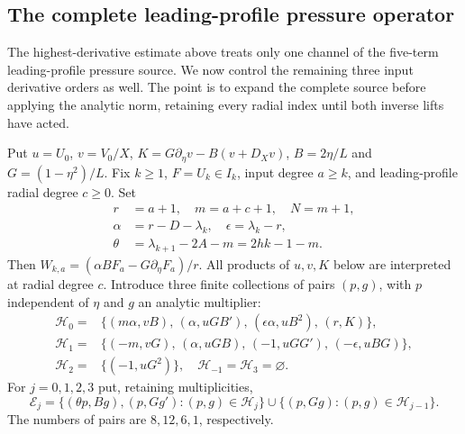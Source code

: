 \subsection{The complete leading-profile pressure operator}
\label{subsec:full-leading-normalform}
The highest-derivative estimate above treats only one channel of the five-term leading-profile pressure source. We now control the remaining three input derivative orders as well. The point is to expand the complete source before applying the analytic norm, retaining every radial index until both inverse lifts have acted.

Put $u=U_0$, $v=V_0/X$, $K=G\partial_\eta v-B(v+D_Xv)$, $B=2\eta/L$ and $G=(1-\eta^2)/L$. Fix $k\ge1$, $F=U_k\in I_k$, input degree $a\ge k$, and leading-profile radial degree $c\ge0$. Set
\begin{align*}
r&=a+1,\quad m=a+c+1,\quad N=m+1,\\
\alpha&=r-D-\lambda_k,\quad\epsilon=\lambda_k-r,\\
\theta&=\lambda_{k+1}-2A-m=2hk-1-m .
\end{align*}
Then $W_{k,a}=(\alpha B F_a-G\partial_\eta F_a)/r$.
All products of $u,v,K$ below are interpreted at radial degree $c$.
Introduce three finite collections of pairs $(p,g)$, with $p$ independent
of $\eta$ and $g$ an analytic multiplier:
\begin{align*}
\mathcal H_0={}&\{(m\alpha,vB),\,(\alpha,uGB'),\,
(\epsilon\alpha,uB^2),\,(r,K)\},\\
\mathcal H_1={}&\{(-m,vG),\,(\alpha,uGB),\,
(-1,uGG'),\,(-\epsilon,uBG)\},\\
\mathcal H_2={}&\{(-1,uG^2)\},\quad
\mathcal H_{-1}=\mathcal H_3=\varnothing.
\end{align*}
For $j=0,1,2,3$ put, retaining multiplicities,
\begin{equation}\label{eq:leading-pair-recursion}
\mathcal E_j=
\{(\theta p,Bg),(p,Gg'):(p,g)\in\mathcal H_j\}
\mathbin{\cup}
\{(p,Gg):(p,g)\in\mathcal H_{j-1}\}.
\end{equation}
The numbers of pairs are $8,12,6,1$, respectively.

